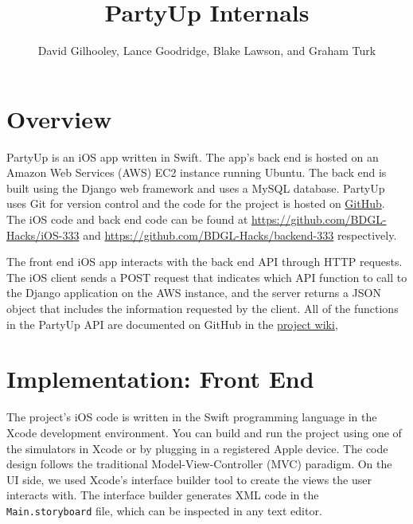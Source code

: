 \documentclass[12pt]{article}
\title{PartyUp Internals}
\author{David Gilhooley, Lance Goodridge, Blake Lawson, and Graham Turk}
\begin{document}
\pagestyle{plain}

\maketitle


\section{Overview}

PartyUp is an iOS app written in Swift.
The app's back end is hosted on an Amazon Web Services (AWS)
EC2 instance running Ubuntu.
The back end is built using the Django web framework and uses
a MySQL database.
PartyUp uses Git for version control and the code for the project is 
hosted on \href{https://github.com/}{GitHub}.
The iOS code and back end code can be found at 
\url{https://github.com/BDGL-Hacks/iOS-333} and
\url{https://github.com/BDGL-Hacks/backend-333} respectively.

The front end iOS app interacts with the back end API through HTTP requests.
The iOS client sends a POST request that indicates which API function to call 
to the Django application on the AWS instance, and the server returns a JSON object that 
includes the information requested by the client.
All of the functions in the PartyUp API are documented on GitHub
in the \href{https://github.com/BDGL-Hacks/backend-333/wiki}{project wiki},


\section{Implementation: Front End}

The project's iOS code is written in the Swift programming language in the Xcode development environment.
You can build and run the project using one of the simulators in Xcode or
by plugging in a registered Apple device.
The code design follows the traditional Model-View-Controller (MVC) paradigm.
On the UI side, we used Xcode's interface builder tool to
create the views the user interacts with.
The interface builder generates XML code in the \texttt{Main.storyboard} file,
which can be inspected in any text editor.
\end{document}
